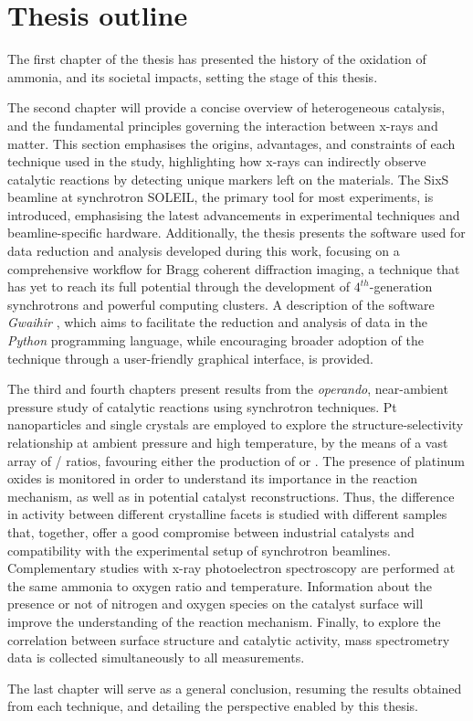 \section{Thesis outline}

The first chapter of the thesis has presented the history of the oxidation of ammonia, and its societal impacts, setting the stage of this thesis.

The second chapter will provide a concise overview of heterogeneous catalysis, and the fundamental principles governing the interaction between x-rays and matter.
This section emphasises the origins, advantages, and constraints of each technique used in the study, highlighting how x-rays can indirectly observe catalytic reactions by detecting unique markers left on the materials.
The SixS beamline at synchrotron SOLEIL, the primary tool for most experiments, is introduced, emphasising the latest advancements in experimental techniques and beamline-specific hardware.
Additionally, the thesis presents the software used for data reduction and analysis developed during this work, focusing on a comprehensive workflow for Bragg coherent diffraction imaging, a technique that has yet to reach its full potential through the development of $4^{th}$-generation synchrotrons and powerful computing clusters.
A description of the software \textit{Gwaihir} \parencite{Simonne2022}, which aims to facilitate the reduction and analysis of data in the \textit{Python} programming language, while encouraging broader adoption of the technique through a user-friendly graphical interface, is provided.

The third and fourth chapters present results from the \textit{operando}, near-ambient pressure study of catalytic reactions using synchrotron techniques.
Pt nanoparticles and single crystals are employed to explore the structure-selectivity relationship at ambient pressure and high temperature, by the means of a vast array of / ratios, favouring either the production of  or .
The presence of platinum oxides is monitored in order to understand its importance in the reaction mechanism, as well as in potential catalyst reconstructions.
Thus, the difference in activity between different crystalline facets is studied with different samples that, together, offer a good compromise between industrial catalysts and compatibility with the experimental setup of synchrotron beamlines.
Complementary studies with x-ray photoelectron spectroscopy are performed at the same ammonia to oxygen ratio and temperature.
Information about the presence or not of nitrogen and oxygen species on the catalyst surface will improve the understanding of the reaction mechanism.
Finally, to explore the correlation between surface structure and catalytic activity, mass spectrometry data is collected simultaneously to all measurements.

The last chapter will serve as a general conclusion, resuming the results obtained from each technique, and detailing the perspective enabled by this thesis.